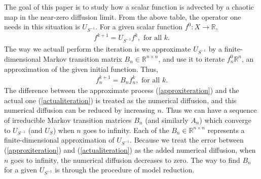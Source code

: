 The goal of this paper is to study how a scalar function is advected by a chaotic map in the near-zero diffusion limit. From the above table, the operator one needs in this situation is $U_{S^{-1}}$. For a given scalar function $f^0: X \to \mathbb{R}$, 
\begin{eqnarray}
\label{actualiteration}
 f^{k+1} = U_{S^{-1}} f^{k}, \text{ for all }k.
\end{eqnarray}
The way we actuall perform the iteration is we approximate $U_{S^{-1}}$ by a finite-dimensional Markov transition matrix $B_n \in \mathbb{R}^{n \times n}$, and use it to iterate  $f_n^0 \mathbb{R}^n $, an approximation of the given initial function. Thus,
\begin{eqnarray}
\label{approxiteration}
 f_n^{k+1} = B_n f_n^{k}, \text{ for all }k.
\end{eqnarray}
The difference between the approximate process (\ref{approxiteration}) and the actual one (\ref{actualiteration}) is treated as the numerical diffusion, and this numerical diffusion can be reduced by increasing $n$. Thus we can have a sequence of irreducible Markov transition matrices $B_n$ (and similarly $A_n$) which converge to $U_{S^{-1}}$ (and $U_S$) when $n$ goes to infinity. Each of the $B_n \in\mathbb{R}^{n \times n}$ represents a finite-dimensional approximation of $U_{S^{-1}}$. Because we treat the error between (\ref{approxiteration}) and (\ref{actualiteration}) as the added numerical diffusion, when $n$ goes to infinity, the numerical diffusion decreases to zero. The way to find $B_n$ for a given $U_{S^{-1}}$ is through the procedure of model reduction.

